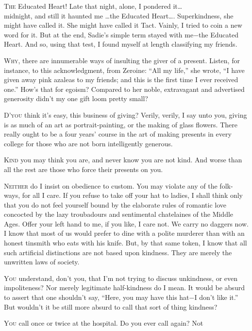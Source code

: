 \documentclass[twosided]{book}
\begin{document}
\lettrine{T}{he} Educated Heart! Late that night, alone, I pondered it\ldots\\
midnight, and still it haunted me \ldots the Educated Heart\ldots.
Superkindness, she might have called it. She might have called it Tact.
Vainly, I tried to coin a new word for it. But at the end, Sadie’s
simple term stayed with me$-$the Educated Heart. And so, using that test,
I found myself at length classifying my friends.

\newpage
\lettrine{W}{hy}, there are innumerable ways of insulting the giver of a present.
Listen, for instance, to this acknowledgment, from Zeroine: “All my
life,” she wrote, “I have given away pink azaleas to my friends; and
this is the first time I ever received one.” How’s that for egoism?
Compared to her noble, extravagant and advertised generosity didn’t my
one gift loom pretty small?

\newpage
\lettrine{D}{’you} think it’s easy, this business of giving? Verily, verily, I say
unto you, giving is as much of an art as portrait-painting, or the
making of glass flowers. There really ought to be a four years’ course
in the art of making presents in every college for those who are not
born intelligently generous.

\newpage
\lettrine{K}{ind} you may think you are, and never know you are not kind. And worse
than all the rest are those who force their presents on you.

\newpage
\lettrine{N}{either} do I insist on obedience to custom. You may violate any of the
folk-ways, for all I care. If you refuse to take off your hat to ladies,
I shall think only that you do not feel yourself bound by the elaborate
rules of romantic love concocted by the lazy troubadours and sentimental
chatelaines of the Middle Ages. Offer your left hand to me, if you like,
I care not. We carry no daggers now. I know that most of us would prefer
to dine with a polite murderer than with an honest tinsmith who eats
with his knife. But, by that same token, I know that all such artificial
distinctions are not based upon kindness. They are merely the unwritten
laws of society.

\newpage
\lettrine{Y}{ou} understand, don’t you, that I’m not trying to discuss unkindness, or
even impoliteness? Nor merely legitimate half-kindness do I mean. It
would be absurd to assert that one shouldn’t say, “Here, you may have
this hat$-$I don’t like it.” But wouldn’t it be still more absurd to call
that sort of thing kindness?

\newpage
\lettrine{Y}{ou} call once or twice at the hospital. Do you ever call again? Not
\end{document}
